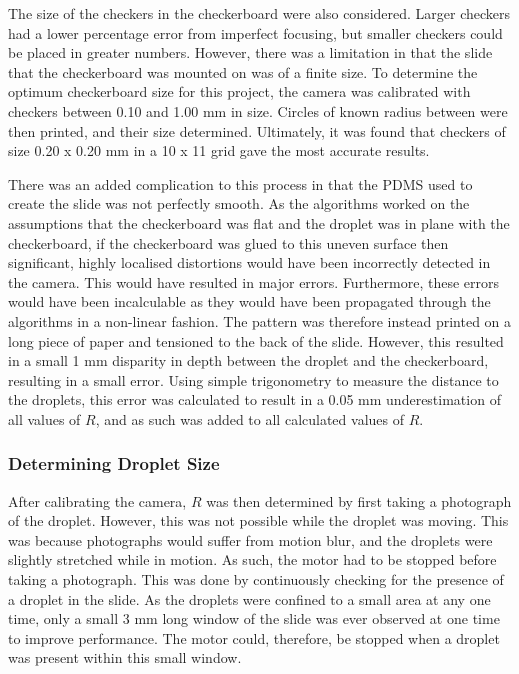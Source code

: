 \documentclass{physics_article_B}
\begin{document}
            The size of the checkers in the checkerboard were also considered. Larger checkers had a lower percentage error from imperfect focusing, but smaller checkers could be placed in greater numbers. However, there was a limitation in that the slide that the checkerboard was mounted on was of a finite size. To determine the optimum checkerboard size for this project, the camera was calibrated with checkers between 0.10 and 1.00 mm in size. Circles of known radius between were then printed, and their size determined. Ultimately, it was found that checkers of size 0.20 x 0.20 mm in a 10 x 11 grid gave the most accurate results. 
            
            There was an added complication to this process in that the PDMS used to create the slide was not perfectly smooth. As the algorithms worked on the assumptions that the checkerboard was flat and the droplet was in plane with the checkerboard, if the checkerboard was glued to this uneven surface then significant, highly localised distortions would have been incorrectly detected in the camera. This would have resulted in major errors. Furthermore, these errors would have been incalculable as they would have been propagated through the algorithms in a non-linear fashion. The pattern was therefore instead printed on a long piece of paper and tensioned to the back of the slide. However, this resulted in a small 1 mm disparity in depth between the droplet and the checkerboard, resulting in a small error. Using simple trigonometry to measure the distance to the droplets, this error was calculated to result in a 0.05 mm underestimation of all values of $R$, and as such was added to all calculated values of $R$. 
        
        \subsubsection{Determining Droplet Size\label{sect:method:vision:size}}
                
            After calibrating the camera, $R$ was then determined by first taking a photograph of the droplet. However, this was not possible while the droplet was moving. This was because photographs would suffer from motion blur, and the droplets were slightly stretched while in motion. As such, the motor had to be stopped before taking a photograph. This was done by continuously checking for the presence of a droplet in the slide. As the droplets were confined to a small area at any one time, only a small 3 mm long window of the slide was ever observed at one time to improve performance. The motor could, therefore, be stopped when a droplet was present within this small window.    
                
\end{document}
